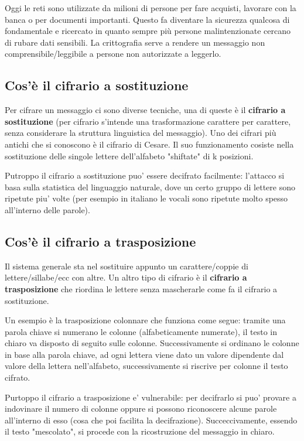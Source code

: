 Oggi le reti sono utilizzate da milioni di persone per fare acquisti, lavorare con la banca o per documenti importanti. Questo fa diventare la sicurezza qualcosa di fondamentale e ricercato in quanto sempre più persone malintenzionate cercano di rubare dati sensibili.
La crittografia serve a rendere un messaggio non comprensibile/leggibile a persone non autorizzate a leggerlo.
\subsection{Cos'è il cifrario a sostituzione}
Per cifrare un messaggio ci sono diverse tecniche, una di queste è il \textbf{cifrario a sostituzione} (per cifrario s'intende una trasformazione carattere per carattere, senza considerare la struttura linguistica del messaggio). Uno dei cifrari più antichi che si conoscono è il cifrario di Cesare. Il suo funzionamento cosiste nella sostituzione delle singole lettere dell'alfabeto "shiftate" di k posizioni. 

Putroppo il cifrario a sostituzione puo' essere decifrato facilmente: l'attacco si basa sulla statistica del linguaggio naturale, dove un certo gruppo di lettere sono ripetute piu' volte (per esempio in italiano le vocali sono ripetute molto spesso all'interno delle parole).
\subsection{Cos'è il cifrario a trasposizione}
Il sistema generale sta nel sostituire appunto un carattere/coppie di lettere/sillabe/ecc con altre.
Un altro tipo di cifrario è il \textbf{cifrario a trasposizione} che riordina le lettere senza mascherarle come fa il cifrario a sostituzione.

Un esempio è la trasposizione colonnare che funziona come segue: tramite una parola chiave si numerano le colonne (alfabeticamente numerate), il testo in chiaro va disposto di seguito sulle colonne. Successivamente si ordinano le colonne in base alla parola chiave, ad ogni lettera viene dato un valore dipendente dal valore della lettera nell'alfabeto, successivamente si riscrive per colonne il testo cifrato.

Purtoppo il cifrario a trasposizione e' vulnerabile: per decifrarlo si puo' provare a indovinare il numero di colonne oppure si possono riconoscere alcune parole all'interno di esso (cosa che poi facilita la decifrazione). Succeccivamente, essendo il testo "mescolato", si procede con la ricostruzione del messaggio in chiaro.

